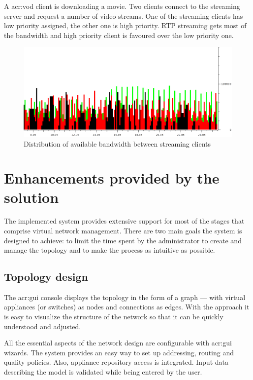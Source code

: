\documentclass[11pt]{book}
\begin{document}
        A \gls{acr:vod} client is downloading a movie. Two clients connect to the streaming server and request a number of video
        streams. One of the streaming clients has low priority assigned, the other one is high priority. RTP streaming
        gets most of the bandwidth and high priority client is favoured over the low priority one.

        \begin{figure}[H]
          \begin{center}
            \includegraphics[width=.7\textwidth]{img/test-case/exp-all.png}
          \end{center}

          \caption{Distribution of available bandwidth between streaming clients}
        \end{figure}


    \section{Enhancements provided by the solution}
    \label{sec:uc:enhance}

      The implemented system provides extensive support for most of the stages that comprise virtual network management.
      There are two main goals the system is designed to achieve: to limit the time spent by the administrator to create
      and manage the topology and to make the process as intuitive as possible.


      \subsection{Topology design}
      \label{sub:uc:enhance:design}

        The \gls{acr:gui} console displays the topology in the form of a graph --- with virtual appliances (or switches) as nodes
        and connections as edges. With the approach it is easy to visualize the structure of the network so that it can
        be quickly understood and adjusted.

        All the essential aspects of the network design are configurable with \gls{acr:gui} wizards. The system provides an easy
        way to set up addressing, routing and quality policies. Also, appliance repository access is integrated. Input
        data describing the model is validated while being entered by the user. 
\end{document}
